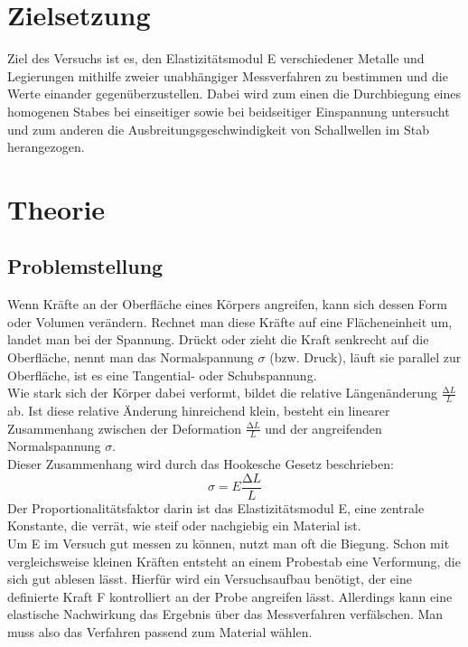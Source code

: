 \section{Zielsetzung}
Ziel des Versuchs ist es, den Elastizitätsmodul E verschiedener Metalle und Legierungen mithilfe zweier unabhängiger Messverfahren zu bestimmen und die Werte einander gegenüberzustellen. Dabei wird zum einen die Durchbiegung eines homogenen Stabes bei einseitiger sowie bei beidseitiger Einspannung untersucht und zum anderen die Ausbreitungsgeschwindigkeit von Schallwellen im Stab herangezogen.\\


\section{Theorie}
\label{sec:Theorie}

\subsection{Problemstellung}
Wenn Kräfte an der Oberfläche eines Körpers angreifen, kann sich dessen Form oder Volumen verändern. Rechnet man diese Kräfte auf eine Flächeneinheit um, landet man bei der Spannung. Drückt oder zieht die Kraft senkrecht auf die Oberfläche, nennt man das Normalspannung $\sigma$ (bzw. Druck), läuft sie parallel zur Oberfläche, ist es eine Tangential- oder Schubspannung.\\
Wie stark sich der Körper dabei verformt, bildet die relative Längenänderung $\frac{\increment L }{L}$ ab. Ist diese relative Änderung hinreichend klein, besteht ein linearer Zusammenhang zwischen der Deformation $\frac{\increment L }{L}$ und der angreifenden Normalspannung $\sigma$.\\
Dieser Zusammenhang wird durch das Hookesche Gesetz beschrieben:\\
\begin{equation}
  \sigma = E \frac{\increment L }{L}  
\end{equation}
Der Proportionalitätsfaktor darin ist das Elastizitätsmodul E, eine zentrale Konstante, die verrät, wie steif oder nachgiebig ein Material ist.\\
Um E im Versuch gut messen zu können, nutzt man oft die Biegung. Schon mit vergleichsweise kleinen Kräften entsteht an einem Probestab eine Verformung, die sich gut ablesen lässt. Hierfür wird ein Versuchsaufbau benötigt, der eine definierte Kraft F kontrolliert an der Probe angreifen lässt. Allerdings kann eine elastische Nachwirkung das Ergebnis über das Messverfahren verfälschen. Man muss also das Verfahren passend zum Material wählen\cite{v103_anleitung}.\\

